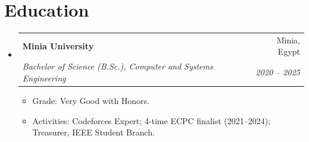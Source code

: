 \documentclass[letterpaper,11pt]{article}
\makeatletter
\newcommand{\resumeItem}[1]{
  \item\small{
    {#1 \vspace{-2pt}}
  }
}
\newcommand{\resumeSubheading}[4]{
  \vspace{-2pt}\item
    \begin{tabular*}{0.97\textwidth}[t]{l@{\extracolsep{\fill}}r}
      \textbf{#1} & #2 \\
      \textit{\small#3} & \textit{\small #4} \\
    \end{tabular*}\vspace{-7pt}
}
\newcommand{\resumeSubHeadingListStart}{\begin{itemize}[leftmargin=0.15in, label={}]}
\newcommand{\resumeSubHeadingListEnd}{\end{itemize}}
\newcommand{\resumeItemListStart}{\begin{itemize}}
\newcommand{\resumeItemListEnd}{\end{itemize}\vspace{-5pt}}
\makeatother
\begin{document}
\section{Education}
  \resumeSubHeadingListStart
    \resumeSubheading
      {Minia University}{Minia, Egypt}
      {Bachelor of Science (B.Sc.), Computer and Systems Engineering}{2020 -- 2025}
      \resumeItemListStart
        \resumeItem{Grade: Very Good with Honors.}
        \resumeItem{Activities: Codeforces Expert; 4-time ECPC finalist (2021--2024); Treasurer, IEEE Student Branch.}
      \resumeItemListEnd
  \resumeSubHeadingListEnd


\end{document}
